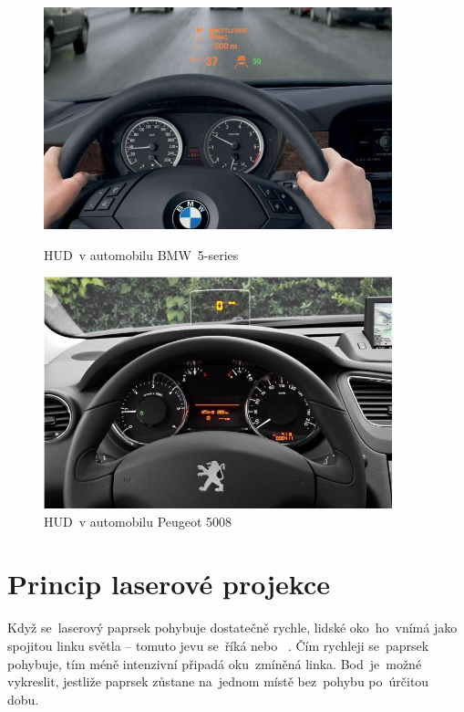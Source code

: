 \begin{figure}[htb]
  \centering
  \begin{minipage}{0.45\textwidth}
    \centering
  \includegraphics[width=0.9\textwidth]{img/huddd.jpg}
  \caption{\label{fig:huddd} HUD~v automobilu BMW~5-series~\cite{dev-of-laser-huds-in-driving}}
  \end{minipage}\hfill
  \begin{minipage}{0.45\textwidth}
    \centering
  \includegraphics[width=0.9\textwidth]{img/hudddd.jpg}
  \caption{\label{fig:hudddd} HUD~v automobilu Peugeot 5008~\cite{dev-of-laser-huds-in-driving}}
  \end{minipage}
\end{figure}

\section{Princip laserové projekce}\label{sec:projection-princip}
Když se~laserový paprsek pohybuje dostatečně rychle, lidské oko~ho~vnímá jako spojitou linku světla -- tomuto jevu se~říká  nebo ~\cite{persistance-of-vision}.
Čím rychleji se~paprsek pohybuje, tím méně intenzivní připadá oku~zmíněná linka. Bod~je~možné vykreslit, jestliže paprsek zůstane na~jednom místě bez~pohybu po~úrčitou dobu.~\cite{laser-projection}

